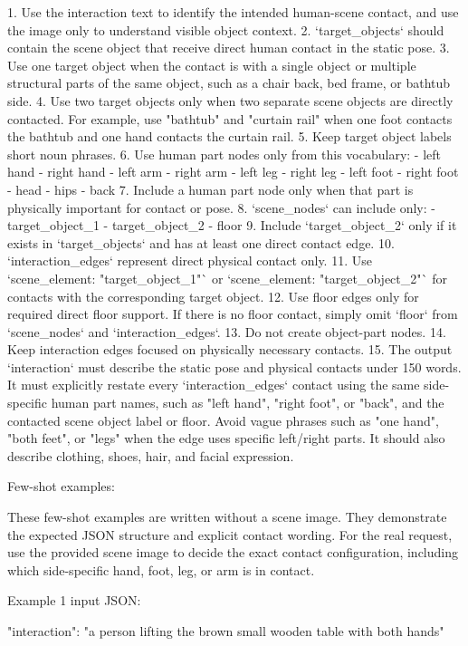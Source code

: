 \begin{promptblock}
1. Use the interaction text to identify the intended human-scene contact, and use the image only to understand visible object context.
2. `target_objects` should contain the scene object that receive direct human contact in the static pose.
3. Use one target object when the contact is with a single object or multiple structural parts of the same object, such as a chair back, bed frame, or bathtub side.
4. Use two target objects only when two separate scene objects are directly contacted. For example, use "bathtub" and "curtain rail" when one foot contacts the bathtub and one hand contacts the curtain rail.
5. Keep target object labels short noun phrases.
6. Use human part nodes only from this vocabulary:
   - left hand
   - right hand
   - left arm
   - right arm
   - left leg
   - right leg
   - left foot
   - right foot
   - head
   - hips
   - back
7. Include a human part node only when that part is physically important for contact or pose.
8. `scene_nodes` can include only:
   - target_object_1
   - target_object_2
   - floor
9. Include `target_object_2` only if it exists in `target_objects` and has at least one direct contact edge.
10. `interaction_edges` represent direct physical contact only.
11. Use `scene_element: "target_object_1"` or `scene_element: "target_object_2"` for contacts with the corresponding target object.
12. Use floor edges only for required direct floor support. If there is no floor contact, simply omit `floor` from `scene_nodes` and `interaction_edges`.
13. Do not create object-part nodes.
14. Keep interaction edges focused on physically necessary contacts.
15. The output `interaction` must describe the static pose and physical contacts under 150 words. It must explicitly restate every `interaction_edges` contact using the same side-specific human part names, such as "left hand", "right foot", or "back", and the contacted scene object label or floor. Avoid vague phrases such as "one hand", "both feet", or "legs" when the edge uses specific left/right parts. It should also describe clothing, shoes, hair, and facial expression.

Few-shot examples:

These few-shot examples are written without a scene image. They demonstrate the
expected JSON structure and explicit contact wording. For the real request, use
the provided scene image to decide the exact contact configuration, including
which side-specific hand, foot, leg, or arm is in contact.

Example 1 input JSON:

{
  "interaction": "a person lifting the brown small wooden table with both hands"
}


\end{promptblock}
